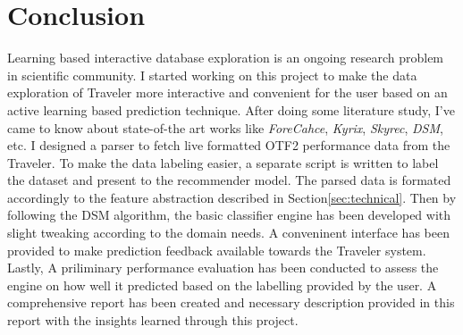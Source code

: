 \section{Conclusion}
\label{sec:summary}
Learning based interactive database exploration is an ongoing research problem in scientific community. I started working on this project to make the data
exploration of Traveler more interactive and convenient for the user based on an active learning based prediction technique. After doing some literature
study, I've came to know about state-of-the art works like \emph{ForeCahce}\cite{battle2016dynamic}, \emph{Kyrix}\cite{tao2019kyrix},
\emph{Skyrec}\cite{liu2019improvement}, \emph{DSM}\cite{huang2018optimization}, etc. I designed a parser to fetch live formatted OTF2 performance data from
the Traveler. To make the data labeling easier, a separate script is written to label the dataset and present to the recommender model. The parsed data is
formated accordingly to the feature abstraction described in Section\ref{sec:technical}. Then by following the DSM algorithm, the basic classifier engine has
been developed with slight tweaking according to the domain needs. A conveninent interface has been provided to make prediction feedback available towards
the Traveler system. Lastly, A priliminary performance evaluation has been conducted to assess the engine on how well it predicted based on the labelling
provided by the user. A comprehensive report has been created and necessary description provided in this report with the insights learned through this
project.